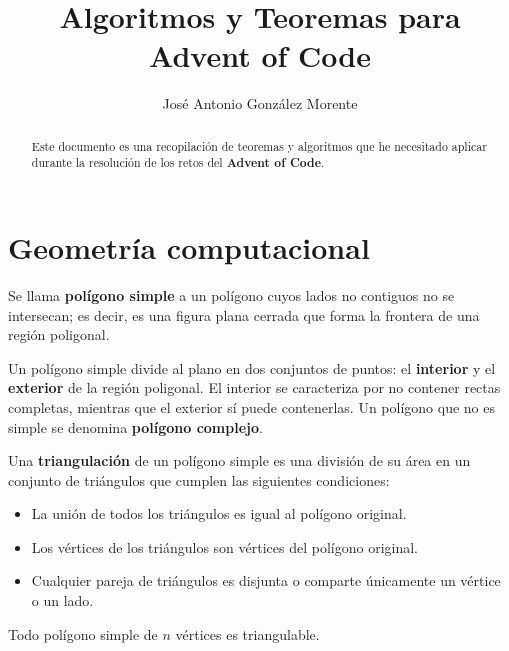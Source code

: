 \documentclass[a4paper,12pt]{article}
\title{\bfseries Algoritmos y Teoremas para Advent of Code}
\author{José Antonio González Morente}
\begin{document}
\maketitle

\begin{abstract}
    Este documento es una recopilación de teoremas y algoritmos que he necesitado aplicar durante la resolución de los retos del \textbf{Advent of Code}.
\end{abstract}

\tableofcontents

\section{Geometría computacional}
\begin{df}
    Se llama \textbf{polígono simple} a un polígono cuyos lados no contiguos no se intersecan; es decir, es una figura plana cerrada que forma la frontera de una región poligonal.
\end{df}

Un polígono simple divide al plano en dos conjuntos de puntos: el \textbf{interior} y el \textbf{exterior} de la región poligonal. El interior se caracteriza por no contener rectas completas, mientras que el exterior sí puede contenerlas. Un polígono que no es simple se denomina \textbf{polígono complejo}.

\begin{df}
    Una \textbf{triangulación} de un polígono simple es una división de su área en un conjunto de triángulos que cumplen las siguientes condiciones:
    \begin{itemize}
        \item La unión de todos los triángulos es igual al polígono original.
        \item Los vértices de los triángulos son vértices del polígono original.
        \item Cualquier pareja de triángulos es disjunta o comparte únicamente un vértice o un lado.
    \end{itemize}
\end{df}

\begin{lem}
    Todo polígono simple de $n$ vértices es triangulable.
\end{lem}
\end{document}
